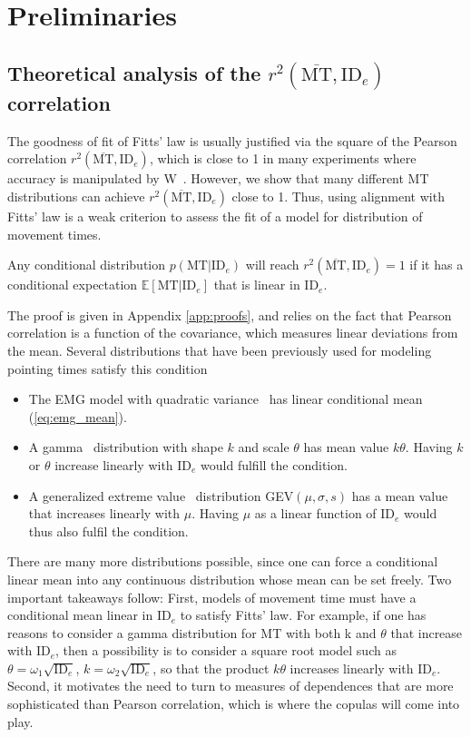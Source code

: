 \documentclass[acmlarge, manuscript,review]{acmart}
\newcommand{\mmt}{\ensuremath{\overline{\mt}}\xspace}
\newcommand{\mt}{\ensuremath{{\text{MT}}}\xspace}
\newcommand{\ide}{\ensuremath{{\text{ID}_e}}\xspace}
\begin{document}
\section{Preliminaries}

\subsection{Theoretical analysis of the $r^2(\mmt, \ide)$ correlation \label{subs:theory_rsq}}

The goodness of fit of Fitts' law is usually justified via the square of the Pearson correlation $r^2(\mmt, \ide)$, which is close to 1 in many experiments where accuracy is manipulated by W~\cite{soukoreff2004}.
However, we show that many different MT distributions can achieve $r^2(\mmt, \ide)$ close to 1. Thus, using alignment with Fitts' law is a weak criterion to assess the fit of a model for distribution of movement times.

\begin{proposition}\label{prop}
  Any conditional distribution $p(\mt|\ide)$ will reach $r^2(\mmt, \ide) = 1$ if it has a conditional expectation $\mathbb{E}[\mt|\ide]$ that is linear in \ide.
\end{proposition}

The proof is given in Appendix \ref{app:proofs}, and relies on the fact that Pearson correlation is a function of the covariance, which measures linear deviations from the mean. Several distributions that have been previously used for modeling pointing times satisfy this condition
\begin{itemize}
  \item The EMG model with quadratic variance~\cite{gori2018these,gori2019, li2024,zhao2022} has linear conditional mean (\autoref{eq:emg_mean}).
  \item A gamma~\cite{jude2016} distribution with shape $k$ and scale $\theta$ has mean value $k\theta$. Having $k$ or $\theta$ increase linearly with \ide would fulfill the condition.
  \item A generalized extreme value~\cite{chapuis2007} distribution GEV$(\mu, \sigma, s)$ has a mean value that increases linearly with $\mu$. Having $\mu$ as a linear function of \ide would thus also fulfil the condition.
\end{itemize}
There are many more distributions possible, since one can force a conditional linear mean into any continuous distribution whose mean can be set freely.
Two important takeaways follow: First, models of movement time must have a conditional mean linear in \ide to satisfy Fitts' law. For example, if one has reasons to consider a gamma distribution for MT with both k and $\theta$ that increase with \ide, then a possibility is to consider a square root model such as $\theta = \omega_1 \sqrt{\ide}$, $k = \omega_2 \sqrt{\ide}$, so that the product $k\theta$ increases linearly with \ide.
Second, it motivates the need to turn to measures of dependences that are more sophisticated than Pearson correlation, which is where the copulas will come into play.
\end{document}
